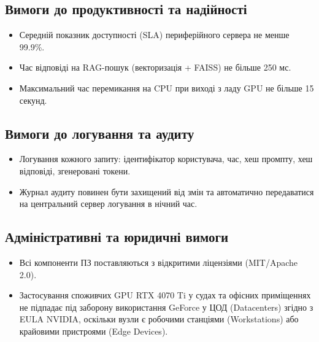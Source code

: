 \documentclass{article}
\begin{document}
\subsection{Вимоги до продуктивності та надійності}
\begin{itemize}
    \item Середній показник доступності (SLA) периферійного сервера не менше 99.9\%.
    \item Час відповіді на RAG-пошук (векторизація + FAISS) не більше 250 мс.
    \item Максимальний час перемикання на CPU при виході з ладу GPU не більше 15 секунд.
\end{itemize}

\subsection{Вимоги до логування та аудиту}
\begin{itemize}
    \item Логування кожного запиту: ідентифікатор користувача, час, хеш промпту, хеш відповіді, згенеровані токени.
    \item Журнал аудиту повинен бути захищений від змін та автоматично передаватися на центральний сервер логування в нічний час.
\end{itemize}

\subsection{Адміністративні та юридичні вимоги}
\begin{itemize}
    \item Всі компоненти ПЗ поставляються з відкритими ліцензіями (MIT/Apache 2.0).
    \item Застосування споживчих GPU RTX 4070 Ti у судах та офісних приміщеннях не підпадає під заборону використання GeForce у ЦОД (Datacenters) згідно з EULA NVIDIA, оскільки вузли є робочими станціями (Workstations) або крайовими пристроями (Edge Devices).
\end{itemize}
\end{document}
